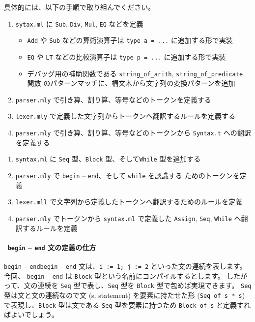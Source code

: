 \documentclass[a4paper,11pt]{jsarticle}
\begin{document}
具体的には、以下の手順で取り組んでください。

\noindent{}

\begin{enumerate}
\item \verb|sytax.ml| に \verb|Sub|, \verb|Div|, \verb|Mul|, \verb|EQ| などを定義
  \begin{itemize}
  \item \verb|Add| や \verb|Sub| などの算術演算子は \verb|type a = ...| に追加する形で実装
  \item \verb|EQ| や \verb|LT| などの比較演算子は \verb|type p = ...| に追加する形で実装
  \item デバッグ用の補助関数である \verb|string_of_arith|, \verb|string_of_predicate| 関数
    のパターンマッチに、構文木から文字列の変換パターンを追加
  \end{itemize}
\item \verb|parser.mly| で引き算、割り算、等号などのトークンを定義する
\item \verb|lexer.mly| で定義した文字列からトークンへ翻訳するルールを定義する
\item \verb|parser.mly| で引き算、割り算、等号などのトークンから \verb|Syntax.t| への翻訳
  を定義する
\end{enumerate}

\noindent{}

\begin{enumerate}
\item \verb|syntax.ml| に \verb|Seq| 型、\verb|Block| 型、そして\verb|While| 型を追加する
\item \verb|parser.mly| で \verb|begin| -- \verb|end|、そして \verb|while| を認識する
  ためのトークンを定義
\item \verb|lexer.mll| で文字列から定義したトークンへ翻訳するためのルールを定義
\item \verb|parser.mly| でトークンから \verb|syntax.ml| で定義した \verb|Assign|,
  \verb|Seq|, \verb|While| へ翻訳するルールを定義
\end{enumerate}

\paragraph*{\, \texttt{begin} -- \texttt{end} 文の定義の仕方}

\texttt{begin} -- \texttt{end}\verb|begin| -- \verb|end| 文は、\verb|i := 1; j := 2| といった文の連続を表します。
今回、 \verb|begin| -- \verb|end| は \verb|Block| 型という名前にコンパイルするとします。
したがって、文の連続を \verb|Seq| 型で表し、\verb|Seq| 型を \verb|Block| 型で包めば実現できます。
\verb|Seq| 型は文と文の連続なので文 (s, statement) を要素に持たせた形
(\verb|Seq of s * s|) で表現し、\verb|Block| 型は文である \verb|Seq| 型を要素に持つため
\verb|Block of s| と定義すればよいでしょう。
\end{document}
